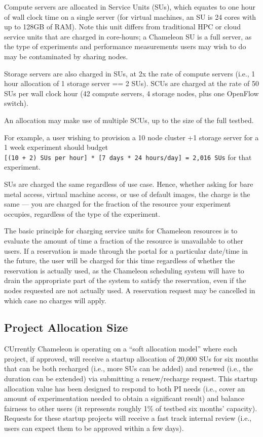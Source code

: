 Compute servers are allocated in Service Units (SUs), which equates to
one hour of wall clock time on a single server (for virtual machines, an
SU is 24 cores with up to 128GB of RAM). Note this unit differs from
traditional HPC or cloud service units that are charged in core-hours; a
Chameleon SU is a full server, as the type of experiments and
performance measurements users may wish to do may be contaminated by
sharing nodes.

Storage servers are also charged in SUs, at 2x the rate of compute
servers (i.e., 1 hour allocation of 1 storage server == 2 SUs). SCUs are
charged at the rate of 50 SUs per wall clock hour (42 compute servers, 4
storage nodes, plus one OpenFlow switch).

An allocation may make use of multiple SCUs, up to the size of the full
testbed.

For example, a user wishing to provision a 10 node cluster +1 storage
server for a 1 week experiment should budget
\texttt{{[}(10\ +\ 2)\ SUs\ per\ hour{]}\ *\ {[}7\ days\ *\ 24\ hours/day{]}\ =\ 2,016\ SUs}
for that experiment.

SUs are charged the same regardless of use case. Hence, whether asking
for bare metal access, virtual machine access, or use of default images,
the charge is the same --- you are charged for the fraction of the
resource your experiment occupies, regardless of the type of the
experiment.

The basic principle for charging service units for Chameleon resources
is to evaluate the amount of time a fraction of the resource is
unavailable to other users. If a reservation is made through the portal
for a particular date/time in the future, the user will be charged for
this time regardless of whether the reservation is actually used, as the
Chameleon scheduling system will have to drain the appropriate part of
the system to satisfy the reservation, even if the nodes requested are
not actually used. A reservation request may be cancelled in which case
no charges will apply.

\subsection{Project Allocation Size}

CUrrently Chameleon is operating on a ``soft allocation
model'' where each project, if approved, will receive a startup
allocation of 20,000 SUs for six months that can be both recharged
(i.e., more SUs can be added) and renewed (i.e., the duration can be
extended) via submitting a renew/recharge request. This startup
allocation value has been designed to respond to both PI needs (i.e.,
cover an amount of experimentation needed to obtain a significant
result) and balance fairness to other users (it represents roughly 1\%
of testbed six months' capacity). Requests for these startup projects
will receive a fast track internal review (i.e., users can expect them
to be approved within a few days).

